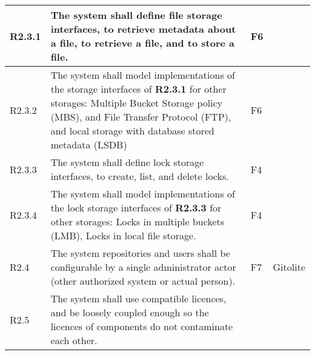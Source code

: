 \documentclass[a4paper,11pt]{article}
\begin{document}
\begin{landscape}
\begin{longtable}{|p{1cm}|p{19cm}|p{2cm}|p{3cm}|}
        \rowcolor[HTML]{EEFFEE}        R2.3.1     & The system shall define file storage interfaces, to retrieve metadata about a file, to retrieve a file, and to store a file.                                                                                                                                                          & F6                    &                                          \\\hline
        \rowcolor[HTML]{FFEEEE}        R2.3.2     & The system shall model implementations of the storage interfaces of \textbf{R2.3.1} for other storages: Multiple Bucket Storage policy (MBS), and File Transfer Protocol (FTP), and local storage with database stored metadata (LSDB)                                                & F6                    &                                          \\\hline
        \rowcolor[HTML]{EEFFEE}        R2.3.3     & The system shall define lock storage interfaces, to create, list, and delete locks.                                                                                                                                                                                                   & F4                    &                                          \\\hline
        \rowcolor[HTML]{FFEEEE}        R2.3.4     & The system shall model implementations of the lock storage interfaces of \textbf{R2.3.3} for other storages: Locks in multiple buckets (LMB), Locks in local file storage.                                                                                                            & F4                    &                                          \\\hline
        \rowcolor[HTML]{DDFFDD}        R2.4       & The system repositories and users shall be configurable by a single administrator actor (other authorized system or actual person).                                                                                                                                                   & F7                    & Gitolite                                 \\ \hline
        \rowcolor[HTML]{DDFFDD}        R2.5       & The system shall use compatible licences, and be loosely coupled enough so the licences of components do not contaminate each other.                                                                                                                                                  &                       &                                          \\ \hline

\end{longtable}
\end{landscape}
\end{document}
